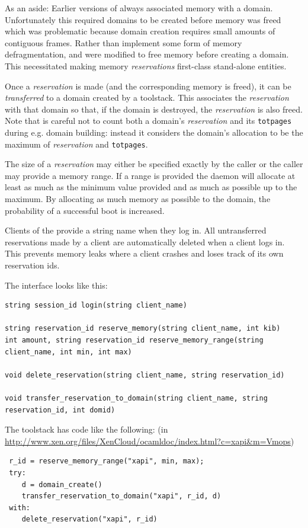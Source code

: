 \documentclass{article}
\begin{document}
As an aside:
Earlier versions of \squeezed{} always associated memory with a \xen{} domain. Unfortunately this required domains to be created before memory was freed which was problematic because domain creation requires small amounts of contiguous frames. Rather than implement some form of memory defragmentation, \squeezed{} and \xapi{} were modified to free memory before creating a domain. This necessitated making memory {\em reservations} first-class stand-alone entities.


Once a {\em reservation} is made (and the corresponding memory is freed), it can be {\em transferred} to a domain created by a toolstack. This associates the {\em reservation} with that domain so that, if the domain is destroyed, the {\em reservation} is also freed. Note that \squeezed{} is careful not to count both a domain's {\em reservation} and its \texttt{totpages} during e.g. domain building: instead it considers the domain's allocation to be the maximum of {\em reservation} and \texttt{totpages}.

The size of a {\em reservation} may either be specified exactly by the caller or the caller may provide a memory range. If a range is provided the daemon will allocate at least as much as the minimum value provided and as much as possible up to the maximum. By allocating as much memory as possible to the domain, the probability of a successful boot is increased.

Clients of the \squeezed{} provide a string name when they log in. All untransferred reservations made by a client are automatically deleted when a client logs in. This prevents memory leaks where a client crashes and loses track of its own reservation ids.

The interface looks like this:
\begin{verbatim}
string session_id login(string client_name)

string reservation_id reserve_memory(string client_name, int kib)
int amount, string reservation_id reserve_memory_range(string client_name, int min, int max)

void delete_reservation(string client_name, string reservation_id)

void transfer_reservation_to_domain(string client_name, string reservation_id, int domid)
\end{verbatim}

The \xapi{} toolstack has code like the following: (in \url{http://www.xen.org/files/XenCloud/ocamldoc/index.html?c=xapi&m=Vmops})
\begin{verbatim}
 r_id = reserve_memory_range("xapi", min, max);
 try:
    d = domain_create()
    transfer_reservation_to_domain("xapi", r_id, d)
 with:
    delete_reservation("xapi", r_id)
\end{verbatim}
\end{document}
